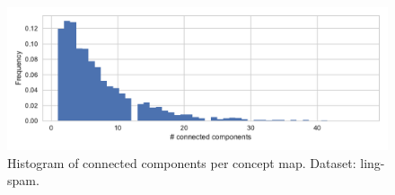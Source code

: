 \begin{figure}[ht]
\centering
\includegraphics[width=0.8\linewidth]{assets/figures/hist-connected-components-ling-spam-CMap.pdf}
\caption{Histogram of connected components per concept map. Dataset: ling-spam.}
\end{figure}


